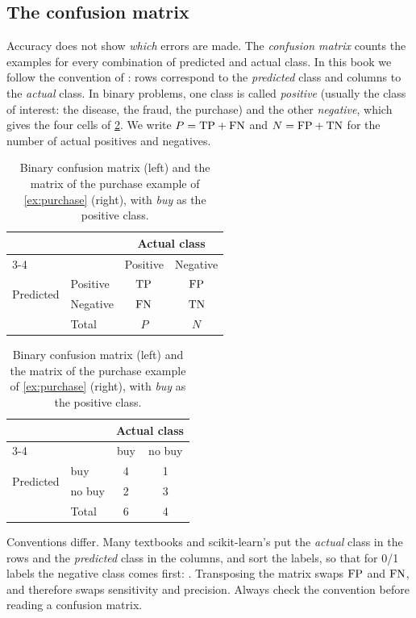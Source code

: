 \subsection{The confusion matrix}

Accuracy does not show \emph{which} errors are made. The \emph{confusion matrix} counts the examples
for every combination of predicted and actual class. In this book we follow the convention
of \citet{fawcett2006introduction}: rows correspond to the \emph{predicted} class and columns
to the \emph{actual} class. In binary problems, one class is called \emph{positive} (usually
the class of interest: the disease, the fraud, the purchase) and the other \emph{negative},
which gives the four cells of \cref{tab:confusion}. We write $P=\mathrm{TP}+\mathrm{FN}$ and $N=\mathrm{FP}+\mathrm{TN}$ for
the number of actual positives and negatives.

\begin{table}[htbp]
\centering\small
\caption{Binary confusion matrix (left) and the matrix of the purchase example of
\cref{ex:purchase} (right), with \emph{buy} as the positive class.}\label{tab:confusion}
\begin{tabular}{@{}llcc@{}}
\toprule
& & \multicolumn{2}{c}{Actual class}\\
\cmidrule(l){3-4}
& & Positive & Negative\\
\midrule
\multirow{2}{*}{Predicted} & Positive & $\mathrm{TP}$ & $\mathrm{FP}$\\
                           & Negative & $\mathrm{FN}$ & $\mathrm{TN}$\\
\midrule
& Total & $P$ & $N$\\
\bottomrule
\end{tabular}\qquad
\begin{tabular}{@{}llcc@{}}
\toprule
& & \multicolumn{2}{c}{Actual class}\\
\cmidrule(l){3-4}
& & buy & no buy\\
\midrule
\multirow{2}{*}{Predicted} & buy    & 4 & 1\\
                           & no buy & 2 & 3\\
\midrule
& Total & 6 & 4\\
\bottomrule
\end{tabular}
\end{table}

\begin{pitfall}
Conventions differ. Many textbooks and scikit-learn's  put the
\emph{actual} class in the rows and the \emph{predicted} class in the columns, and sort the
labels, so that for 0/1 labels the negative class comes first:
. Transposing the matrix swaps
$\mathrm{FP}$ and $\mathrm{FN}$, and therefore swaps sensitivity and precision. Always check the convention
before reading a confusion matrix.
\end{pitfall}

